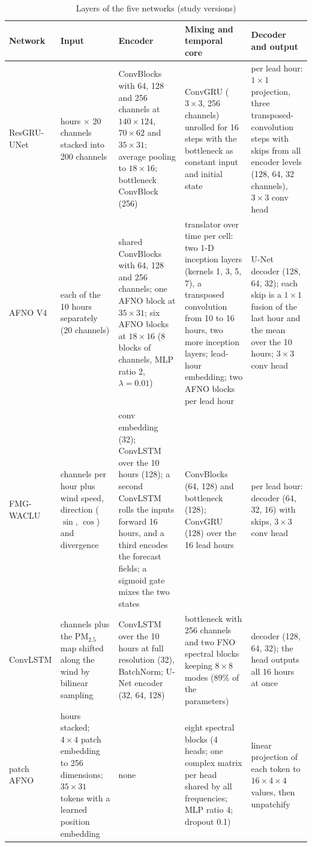 \documentclass[journal]{IEEEtran}
\newcommand{\PM}{PM$_{2.5}$}
\begin{document}
\begin{table}[t]
\centering
\caption{Layers of the five networks (study versions)}
\label{tab:archdetail}
\setlength{\tabcolsep}{3pt}
\begin{tabular}{@{}>{\raggedright\arraybackslash}p{}>{\raggedright\arraybackslash}p{}>{\raggedright\arraybackslash}p{}>{\raggedright\arraybackslash}p{}>{\raggedright\arraybackslash}p{}@{}}
\toprule
Network & Input & Encoder & Mixing and temporal core & Decoder and output \\
\midrule
ResGRU-UNet & 10 hours $\times$ 20 channels stacked into 200 channels & ConvBlocks with 64, 128 and 256 channels at $140\times124$, $70\times62$ and $35\times31$; average pooling to $18\times16$; bottleneck ConvBlock (256) & ConvGRU ($3\times3$, 256 channels) unrolled for 16 steps with the bottleneck as constant input and initial state & per lead hour: $1\times1$ projection, three transposed-convolution steps with skips from all encoder levels (128, 64, 32 channels), $3\times3$ conv head \\
\addlinespace
AFNO V4 & each of the 10 hours separately (20 channels) & shared ConvBlocks with 64, 128 and 256 channels; one AFNO block at $35\times31$; six AFNO blocks at $18\times16$ (8 blocks of channels, MLP ratio 2, $\lambda=0.01$) & translator over time per cell: two 1-D inception layers (kernels 1, 3, 5, 7), a transposed convolution from 10 to 16 hours, two more inception layers; lead-hour embedding; two AFNO blocks per lead hour & U-Net decoder (128, 64, 32); each skip is a $1\times1$ fusion of the last hour and the mean over the 10 hours; $3\times3$ conv head \\
\addlinespace
FMG-WACLU & 20 channels per hour plus wind speed, direction ($\sin$, $\cos$) and divergence & conv embedding (32); ConvLSTM over the 10 hours (128); a second ConvLSTM rolls the inputs forward 16 hours, and a third encodes the forecast fields; a sigmoid gate mixes the two states & ConvBlocks (64, 128) and bottleneck (128); ConvGRU (128) over the 16 lead hours & per lead hour: decoder (64, 32, 16) with skips, $3\times3$ conv head \\
\addlinespace
ConvLSTM & 20 channels plus the \PM{} map shifted along the wind by bilinear sampling & ConvLSTM over the 10 hours at full resolution (32), BatchNorm; U-Net encoder (32, 64, 128) & bottleneck with 256 channels and two FNO spectral blocks keeping $8\times8$ modes (89\% of the parameters) & decoder (128, 64, 32); the head outputs all 16 hours at once \\
\addlinespace
patch AFNO & 10 hours stacked; $4\times4$ patch embedding to 256 dimensions; $35\times31$ tokens with a learned position embedding & none & eight spectral blocks (4 heads; one complex matrix per head shared by all frequencies; MLP ratio 4; dropout 0.1) & linear projection of each token to $16\times4\times4$ values, then unpatchify \\
\bottomrule
\end{tabular}
\end{table}
\end{document}
